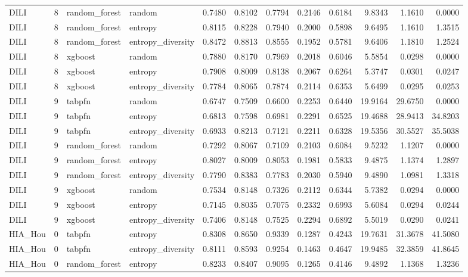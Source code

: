\begin{tabular}{lrllrrrrrrrr}
DILI & 8 & random_forest & random & 0.7480 & 0.8102 & 0.7794 & 0.2146 & 0.6184 & 9.8343 & 1.1610 & 0.0000 \\
DILI & 8 & random_forest & entropy & 0.8115 & 0.8228 & 0.7940 & 0.2000 & 0.5898 & 9.6495 & 1.1610 & 1.3515 \\
DILI & 8 & random_forest & entropy_diversity & 0.8472 & 0.8813 & 0.8555 & 0.1952 & 0.5781 & 9.6406 & 1.1810 & 1.2524 \\
DILI & 8 & xgboost & random & 0.7880 & 0.8170 & 0.7969 & 0.2018 & 0.6046 & 5.5854 & 0.0298 & 0.0000 \\
DILI & 8 & xgboost & entropy & 0.7908 & 0.8009 & 0.8138 & 0.2067 & 0.6264 & 5.3747 & 0.0301 & 0.0247 \\
DILI & 8 & xgboost & entropy_diversity & 0.7784 & 0.8065 & 0.7874 & 0.2114 & 0.6353 & 5.6499 & 0.0295 & 0.0253 \\
DILI & 9 & tabpfn & random & 0.6747 & 0.7509 & 0.6600 & 0.2253 & 0.6440 & 19.9164 & 29.6750 & 0.0000 \\
DILI & 9 & tabpfn & entropy & 0.6813 & 0.7598 & 0.6981 & 0.2291 & 0.6525 & 19.4688 & 28.9413 & 34.8203 \\
DILI & 9 & tabpfn & entropy_diversity & 0.6933 & 0.8213 & 0.7121 & 0.2211 & 0.6328 & 19.5356 & 30.5527 & 35.5038 \\
DILI & 9 & random_forest & random & 0.7292 & 0.8067 & 0.7109 & 0.2103 & 0.6084 & 9.5232 & 1.1207 & 0.0000 \\
DILI & 9 & random_forest & entropy & 0.8027 & 0.8009 & 0.8053 & 0.1981 & 0.5833 & 9.4875 & 1.1374 & 1.2897 \\
DILI & 9 & random_forest & entropy_diversity & 0.7790 & 0.8383 & 0.7783 & 0.2030 & 0.5940 & 9.4890 & 1.0981 & 1.3318 \\
DILI & 9 & xgboost & random & 0.7534 & 0.8148 & 0.7326 & 0.2112 & 0.6344 & 5.7382 & 0.0294 & 0.0000 \\
DILI & 9 & xgboost & entropy & 0.7145 & 0.8035 & 0.7075 & 0.2332 & 0.6993 & 5.6084 & 0.0294 & 0.0244 \\
DILI & 9 & xgboost & entropy_diversity & 0.7406 & 0.8148 & 0.7525 & 0.2294 & 0.6892 & 5.5019 & 0.0290 & 0.0241 \\
HIA_Hou & 0 & tabpfn & entropy & 0.8308 & 0.8650 & 0.9339 & 0.1287 & 0.4243 & 19.7631 & 31.3678 & 41.5080 \\
HIA_Hou & 0 & tabpfn & entropy_diversity & 0.8111 & 0.8593 & 0.9254 & 0.1463 & 0.4647 & 19.9485 & 32.3859 & 41.8645 \\
HIA_Hou & 0 & random_forest & entropy & 0.8233 & 0.8407 & 0.9095 & 0.1265 & 0.4146 & 9.4892 & 1.1368 & 1.3236 \\

\end{tabular}
